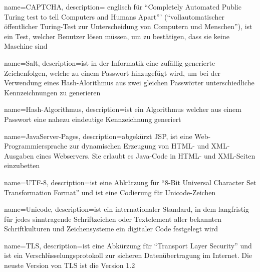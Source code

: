 {
	name=CAPTCHA,
	description={
		englisch für "`Completely Automated Public Turing test to tell Computers and Humans Apart"'' ("`vollautomatischer öffentlicher Turing-Test zur Unterscheidung von Computern und Menschen"'), ist ein Test, welcher Benutzer lösen müssen, um zu bestätigen, dass sie keine Maschine sind
	}
}



{
	name=Salt,
	description={ist in der Informatik eine zufällig generierte Zeichenfolgen, welche zu einem Passwort  hinzugefügt wird, um bei der Verwendung eines Hash-Alorithmus aus zwei gleichen Passwörter unterschiedliche Kennzeichnungen zu generieren}
}

{
	name={Hash-Algorithmus},
	description={ist ein Algorithmus welcher aus einem Passwort eine nahezu eindeutige Kennzeichnung generiert}
}

{
	name={JavaServer-Pages},
	description={abgekürzt JSP, ist eine Web-Programmiersprache zur dynamischen Erzeugung von HTML- und XML-Ausgaben eines Webservers. Sie erlaubt es Java-Code in HTML- und XML-Seiten einzubetten}
}

{
	name={UTF-8},
	description={ist eine Abkürzung für "`8-Bit Universal Character Set Transformation Format"' und ist eine Codierung für \gls{Unicode}-Zeichen}
}

{
	name={Unicode},
	description={ist ein internationaler Standard, in dem langfristig für jedes sinntragende Schriftzeichen oder Textelement aller bekannten Schriftkulturen und Zeichensysteme ein digitaler Code festgelegt wird}
}

{
	name={TLS},
	description={ist eine Abkürzung für "`Transport Layer Security"' und ist ein Verschlüsselungsprotokoll zur sicheren Datenübertragung im Internet. Die neuste Version von \gls{TLS} ist die Version 1.2}
}
